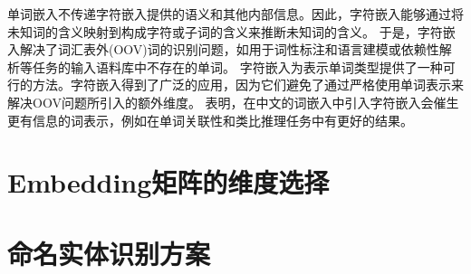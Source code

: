 单词嵌入不传递字符嵌入提供的语义和其他内部信息。因此，字符嵌入能够通过将未知词的含义映射到构成字符或子词的含义来推断未知词的含义。
于是，字符嵌入解决了词汇表外(OOV)词的识别问题，如用于词性标注和语言建模或依赖性解析\parencite{ballesteros2015improved}等任务的输入语料库中不存在的单词。
字符嵌入为表示单词类型提供了一种可行的方法。字符嵌入得到了广泛的应用，因为它们避免了通过严格使用单词表示来解决OOV问题所引入的额外维度。
\parencite{chen2015joint}表明，在中文的词嵌入中引入字符嵌入会催生更有信息的词表示，例如在单词关联性和类比推理任务中有更好的结果。


\section{Embedding矩阵的维度选择}


\section{命名实体识别方案}


